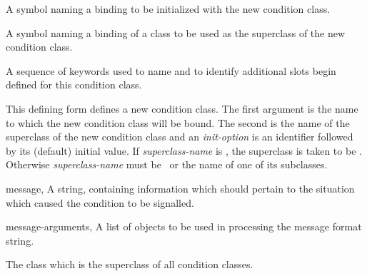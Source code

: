 \begin{optDefinition}
%
\label{defcondition}
%
\Syntax
\label{defcondition-syntax}
%
%
\begin{arguments}
    \item[\scref{condition-class-name}] A symbol naming a binding to be
    initialized with the new condition class.

    \item[\scref{condition-superclass-name}] A symbol naming a binding of a
    class to be used as the superclass of the new condition class.

    \item[\scseqref{slot-name}] A sequence of keywords used to name and to
    identify additional slots begin defined for this condition class.
\end{arguments}
%
\remarks%
This defining form defines a new condition class.  The first argument is the
name to which the new condition class will be bound.  The second is the name of
the superclass of the new condition class and an {\em init-option\/} is an
identifier followed by its (default) initial value.  If {\em superclass-name\/}
is \nil{}, the superclass is taken to be .  Otherwise {\em
    superclass-name\/} must be \ or the name of one of its
subclasses.

\label{\conditionlabel{condition}}
%
\begin{initoptions}
    \item[message, \classref{string}] A string, containing information which
    should pertain to the situation which caused the condition to be signalled.

    \item[message-arguments, \classref{list}] A list of objects to be used in
    processing the message format string.
\end{initoptions}
%
\remarks%
The class which is the superclass of all condition classes.


\end{optDefinition}
